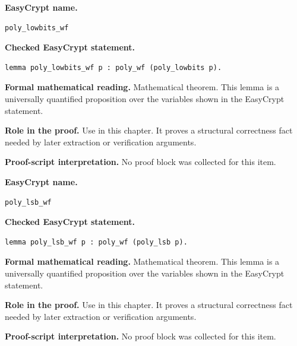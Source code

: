 \begin{formaltheorem}
\noindent\textbf{EasyCrypt name.}
\begin{lstlisting}[language=EasyCrypt,basicstyle=\ttfamily\scriptsize]
poly_lowbits_wf
\end{lstlisting}
\noindent\textbf{Checked EasyCrypt statement.}
\begin{lstlisting}[language=EasyCrypt,basicstyle=\ttfamily\scriptsize]
lemma poly_lowbits_wf p : poly_wf (poly_lowbits p).
\end{lstlisting}
\noindent\textbf{Formal mathematical reading.}
Mathematical theorem. This lemma is a universally quantified proposition over the variables shown in the EasyCrypt statement.

\noindent\textbf{Role in the proof.}
Use in this chapter. It proves a structural correctness fact needed by later extraction or verification arguments.

\noindent\textbf{Proof-script interpretation.}
No proof block was collected for this item.

\end{formaltheorem}

\begin{formaltheorem}
\noindent\textbf{EasyCrypt name.}
\begin{lstlisting}[language=EasyCrypt,basicstyle=\ttfamily\scriptsize]
poly_lsb_wf
\end{lstlisting}
\noindent\textbf{Checked EasyCrypt statement.}
\begin{lstlisting}[language=EasyCrypt,basicstyle=\ttfamily\scriptsize]
lemma poly_lsb_wf p : poly_wf (poly_lsb p).
\end{lstlisting}
\noindent\textbf{Formal mathematical reading.}
Mathematical theorem. This lemma is a universally quantified proposition over the variables shown in the EasyCrypt statement.

\noindent\textbf{Role in the proof.}
Use in this chapter. It proves a structural correctness fact needed by later extraction or verification arguments.

\noindent\textbf{Proof-script interpretation.}
No proof block was collected for this item.

\end{formaltheorem}

